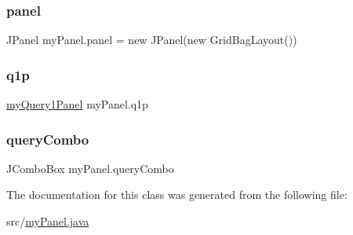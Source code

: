 \subsubsection{\texorpdfstring{panel}{panel}}
{\footnotesize\ttfamily J\+Panel my\+Panel.\+panel = new J\+Panel(new Grid\+Bag\+Layout())\hspace{0.3cm}{\ttfamily [private]}}

\hypertarget{classmy_panel_ac348cee6b7813ba64232d00d6ced4e32}{}\label{classmy_panel_ac348cee6b7813ba64232d00d6ced4e32} 
\subsubsection{\texorpdfstring{q1p}{q1p}}
{\footnotesize\ttfamily \hyperlink{classmy_query1_panel}{my\+Query1\+Panel} my\+Panel.\+q1p\hspace{0.3cm}{\ttfamily [private]}}

\hypertarget{classmy_panel_a813f1c40dfebaf8ba021a08f7cc224e6}{}\label{classmy_panel_a813f1c40dfebaf8ba021a08f7cc224e6} 
\subsubsection{\texorpdfstring{query\+Combo}{queryCombo}}
{\footnotesize\ttfamily J\+Combo\+Box my\+Panel.\+query\+Combo\hspace{0.3cm}{\ttfamily [private]}}



The documentation for this class was generated from the following file\+:\begin{DoxyCompactItemize}
\item 
src/\hyperlink{my_panel_8java}{my\+Panel.\+java}\end{DoxyCompactItemize}
